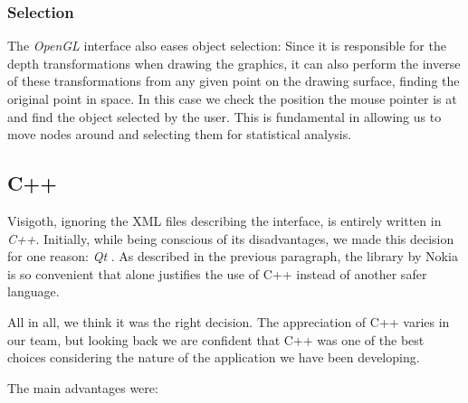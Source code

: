 \documentclass[a4paper,11pt,titlepage]{article}
\newcommand{\buzz}[1]{\emph{#1}}
\newcommand{\Qt}{\buzz{Qt} }
\newcommand{\OpenGL}{\buzz{OpenGL} }
\begin{document}
\subsubsection{Selection}
The \OpenGL interface also eases object selection: Since it is
responsible for the depth transformations when drawing the graphics,
it can also perform the inverse of these transformations from any
given point on the drawing surface, finding the original point in
space. In this case we check the position the mouse pointer is at and
find the object selected by the user. This is fundamental in allowing
us to move nodes around and selecting them for statistical analysis.

\subsection{C++}

Visigoth, ignoring the XML files describing the interface, is entirely
written in \buzz{C++}. Initially, while being conscious of its
disadvantages, we made this decision for one reason: \buzz{\Qt}. As
described in the previous paragraph, the library by Nokia is so
convenient that alone justifies the use of C++ instead of another
safer language.

All in all, we think it was the right decision. The appreciation of
C++ varies in our team, but looking back we are confident that C++ was
one of the best choices considering the nature of the application we
have been developing.

The main advantages were:
\end{document}

